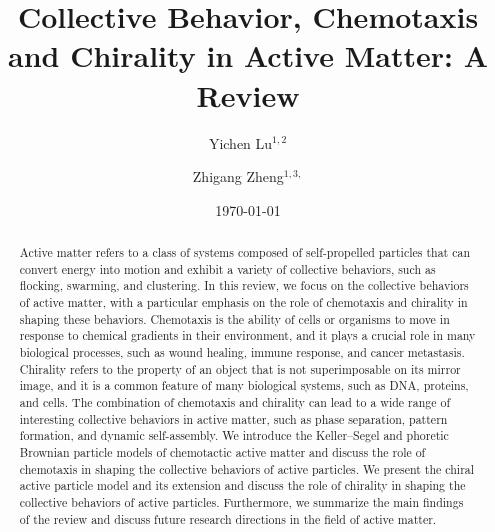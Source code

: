 \documentclass[a4paper, amsfonts, amssymb, amsmath, reprint, showkeys, showpacs, nofootinbib, twoside]{revtex4-2}
\begin{document}
\title{Collective Behavior, Chemotaxis and Chirality in Active Matter: A Review}

\author{Yichen Lu$^{1,2}$}
\author{Zhigang Zheng$^{1,3,}$}


\date{\today} %

\begin{abstract}
    Active matter refers to a class of systems composed of self-propelled particles that can convert energy into motion and exhibit a variety of collective behaviors, such as flocking, swarming, and clustering. In this review, we focus on the collective behaviors of active matter, with a particular emphasis on the role of chemotaxis and chirality in shaping these behaviors. Chemotaxis is the ability of cells or organisms to move in response to chemical gradients in their environment, and it plays a crucial role in many biological processes, such as wound healing, immune response, and cancer metastasis. Chirality refers to the property of an object that is not superimposable on its mirror image, and it is a common feature of many biological systems, such as DNA, proteins, and cells. The combination of chemotaxis and chirality can lead to a wide range of interesting collective behaviors in active matter, such as phase separation, pattern formation, and dynamic self-assembly. We introduce the Keller--Segel and phoretic Brownian particle models of chemotactic active matter and discuss the role of chemotaxis in shaping the collective behaviors of active particles. We present the chiral active particle model and its extension and discuss the role of chirality in shaping the collective behaviors of active particles. Furthermore, we summarize the main findings of the review and discuss future research directions in the field of active matter.
\end{abstract}


\maketitle
\end{document}
